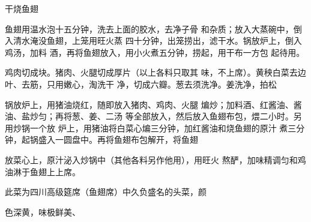 \begin{recipe}{干烧鱼翅}

\ingredients


\cooking

\step 鱼翅用温水泡十五分钟，洗去上面的胶水，去净子骨 和杂质；放入大蒸碗中，倒入清水淹没鱼翅，上笼用旺火蒸 四十分钟，出笼捞出，滤干水。锅放炉上，倒入鸡汤，加料 酒，再将鱼翅放入，用小火煮五分钟，捞起，用干布一方包 起待用。

\step 鸡肉切成块。猪肉、火腿切成厚片（以上各料只取其 味，不上席）。黄秧白菜去边叶、去筋，只用嫩心，淘洗干 净，切成六瓣。葱去须洗净。姜洗净，拍松

\step 锅放炉上，用猪油烧红，随即放入猪肉、鸡肉、火腿 煸炒；加料酒、红酱油、酱油、盐炒匀；再将葱、姜、二汤 等全部放入，然后放入鱼翅布包，煨二小时。另用炒锅一个放 炉上，用猪油将白菜心煸三分钟，加红酱油和烧鱼翅的原汁 煮三分钟，起锅盛入一圆盘中。再将鱼翅布包解开，将鱼翅

放菜心上，原汁泌入炒锅中（其他各料另作他用），用旺火 熬酽，加味精调匀和鸡油淋于鱼翅上上席。

\notes

此菜为四川高级筵席（鱼翅席）中久负盛名的头菜，颜

色深黄，味极鲜美、

\end{recipe}

